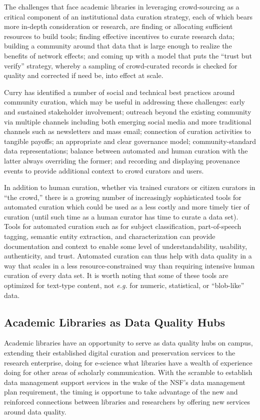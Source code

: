 \documentclass{acm_proc_article-sp}
\begin{document}
The challenges that face academic libraries in leveraging
crowd-sourcing as a critical component of an institutional data
curation strategy, each of which bears more in-depth consideration or
research, are finding or allocating sufficient resources to build
tools; finding effective incentives to curate research data; building
a community around that data that is large enough to realize the
benefits of network effects; and coming up with a model that puts the
``trust but verify'' strategy, whereby a sampling of crowd-curated
records is checked for quality and corrected if need be, into effect
at scale.

Curry \cite{curry:community} has identified a number of social and
technical best practices around community curation, which may be
useful in addressing these challenges: early and sustained stakeholder
involvement; outreach beyond the existing community via multiple
channels including both emerging social media and more traditional
channels such as newsletters and mass email; connection of curation
activities to tangible payoffs; an appropriate and clear governance
model; community-standard data representations; balance between
automated and human curation with the latter always overriding the
former; and recording and displaying provenance events to provide
additional context to crowd curators and users.

In addition to human curation, whether via trained curators or citizen
curators in ``the crowd,'' there is a growing number of increasingly
sophisticated tools for automated curation which could be used as a
less costly and more timely tier of curation (until such time as a
human curator has time to curate a data set). Tools for automated
curation such as for subject classification, part-of-speech tagging,
semantic entity extraction, and characterization can provide
documentation and context to enable some level of understandability,
usability, authenticity, and trust. Automated curation can thus help
with data quality in a way that scales in a less resource-constrained
way than requiring intensive human curation of every data set. It is
worth noting that some of these tools are optimized for text-type
content, not \textit{e.g.} for numeric, statistical, or ``blob-like''
data.

\subsection{Academic Libraries as Data Quality Hubs}

Academic libraries have an opportunity to serve as data quality hubs
on campus, extending their established digital curation and
preservation services to the research enterprise, doing for e-science
what libraries have a wealth of experience doing for other areas of
scholarly communication. With the scramble to establish data
management support services in the wake of the NSF's data management
plan requirement, the timing is opportune to take advantage of the new
and reinforced connections between libraries and researchers by
offering new services around data quality.
\end{document}
